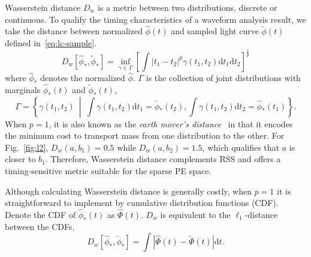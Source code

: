 Wasserstein distance $D_w$ is a metric between two distributions, discrete or continuous. To qualify the timing characteristics of a waveform analysis result, we take the distance between normalized $\hat{\phi}(t)$ and sampled light curve $\tilde{\phi}(t)$ defined in~\eqref{eq:lc-sample}.
\begin{equation}
  D_w\left[\hat{\phi}_*, \tilde{\phi}_*\right] = \inf_{\gamma \in \Gamma} \left[\int \left\vert t_1 - t_2 \right\vert^p \gamma(t_1, t_2)\mathrm{d}t_1\mathrm{d}t_2\right]^{\frac{1}{p}}
\end{equation}
where $\hat{\phi}_*$ denotes the normalized $\hat{\phi}$. $\Gamma$ is the collection of joint distributions with marginals $\hat{\phi}_*(t)$ and $\tilde{\phi}_*(t)$,
\begin{equation*}
  \label{eq:joint}
  \Gamma = \left\{\gamma(t_1, t_2) ~\middle\vert~ \int\gamma(t_1,t_2)\mathrm{d}t_1 = \tilde{\phi}_*(t_2) , \int\gamma(t_1,t_2)\mathrm{d}t_2 = \hat{\phi}_*(t_1)  \right\}.
\end{equation*}
When $p=1$, it is also known as the \textit{earth mover's distance}~\cite{levina_earth_2001} in that it encodes the minimum cost to transport mass from one distribution to the other.
For Fig.~\ref{fig:l2}, $D_w(a, b_1) = 0.5$ while $D_w(a, b_2) = 1.5$, which qualifies that $a$ is closer to $b_1$.  Therefore, Wasserstein distance complements RSS and offers a timing-sensitive metric suitable for the sparse PE space.

Although calculating Wasserstein distance is generally costly, when $p=1$ it is straightforward to implement by cumulative distribution functions (CDF).  Denote the CDF of $\hat{\phi}_*(t)$ as $\hat\Phi(t)$.  $D_w$ is equivalent to the $\ell_1$-distance between the CDFs,
\begin{equation}
    D_w\left[\hat{\phi}_*, \tilde{\phi}_*\right] = \int\left|\hat{\Phi}(t) - \tilde{\Phi}(t)\right| \mathrm{d}t.
    \label{eq:numerical}
\end{equation}
